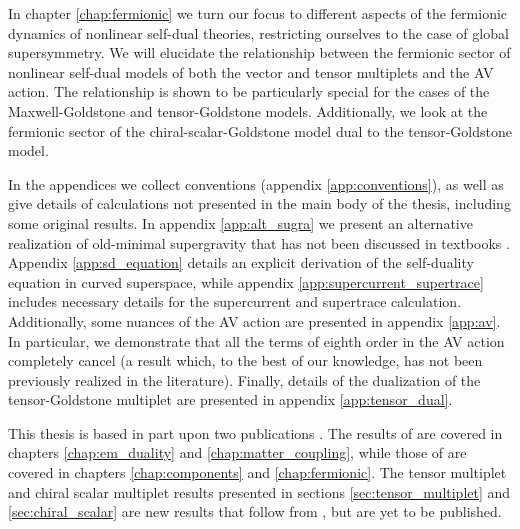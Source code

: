 In chapter \ref{chap:fermionic} we turn our focus to different aspects of the fermionic dynamics of nonlinear self-dual theories, restricting ourselves to the case of global supersymmetry. We will elucidate the relationship between the fermionic sector of nonlinear self-dual models of both the vector and tensor multiplets and the AV action. The relationship is shown to be particularly special for the cases of the Maxwell-Goldstone and tensor-Goldstone models. Additionally, we look at the fermionic sector of the chiral-scalar-Goldstone model dual to the tensor-Goldstone model.

In the appendices we collect conventions (appendix \ref{app:conventions}), as well as give details of calculations not presented in the main body of the thesis, including some original results. In appendix \ref{app:alt_sugra} we present an alternative realization of old-minimal supergravity that has not been discussed in textbooks \cite{Gates:1983nr,Bagger:1990qh,Buchbinder:1998qv}. Appendix \ref{app:sd_equation} details an explicit derivation of the self-duality equation in curved superspace, while appendix \ref{app:supercurrent_supertrace} includes necessary details for the supercurrent and supertrace calculation. Additionally, some nuances of the AV action are presented in appendix \ref{app:av}. In particular, we demonstrate that all the terms of eighth order in the AV action 
completely cancel (a result which, to the best of our knowledge, has not been previously realized in the literature). Finally, details of the dualization of the tensor-Goldstone multiplet are presented in appendix \ref{app:tensor_dual}.

This thesis is based in part upon two publications \cite{Kuzenko:2002vk, Kuzenko:2005wh}. The results of \cite{Kuzenko:2002vk} are covered in chapters \ref{chap:em_duality} and \ref{chap:matter_coupling}, while those of \cite{Kuzenko:2005wh} are covered in chapters \ref{chap:components} and \ref{chap:fermionic}. The tensor multiplet and chiral scalar multiplet results presented in sections \ref{sec:tensor_multiplet} and \ref{sec:chiral_scalar} are new results that follow from \cite{Kuzenko:2005wh}, but are yet to be published.
